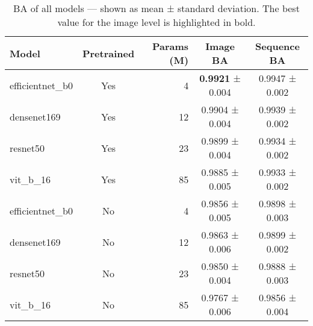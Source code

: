 \begin{table}[H]
\centering
\caption{\acs{BA} of all models --- shown as mean ± standard deviation. The best value for the image level is highlighted in bold.}
\label{tab:bal_acc_by_model}
\begin{tabular}{l c r c c}
\toprule
Model & Pretrained & Params (M) & Image \acs{BA} & Sequence \acs{BA} \\
\midrule
efficientnet\_b0 & Yes & 4 & \textbf{0.9921} ± 0.004 & 0.9947 ± 0.002 \\
densenet169 & Yes & 12 & 0.9904 ± 0.004 & 0.9939 ± 0.002 \\
resnet50 & Yes & 23 & 0.9899 ± 0.004 & 0.9934 ± 0.002 \\
vit\_b\_16 & Yes & 85 & 0.9885 ± 0.005 & 0.9933 ± 0.002 \\
\midrule
efficientnet\_b0 & No & 4 & 0.9856 ± 0.005 & 0.9898 ± 0.003 \\
densenet169 & No & 12 & 0.9863 ± 0.006 & 0.9899 ± 0.002 \\
resnet50 & No & 23 & 0.9850 ± 0.004 & 0.9888 ± 0.003 \\
vit\_b\_16 & No & 85 & 0.9767 ± 0.006 & 0.9856 ± 0.004 \\
\bottomrule
\end{tabular}
\end{table}